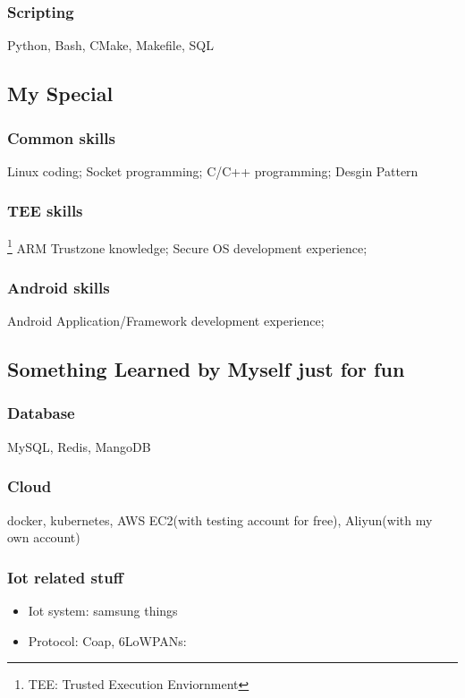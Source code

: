 \documentclass{article}
\begin{document}
\subsubsection{Scripting}
Python, Bash, CMake, Makefile, SQL

\subsection{My Special}

\subsubsection {Common skills}
Linux coding; Socket programming; C/C++ programming; Desgin Pattern

\subsubsection {TEE skills} \footnote{TEE: Trusted Execution Enviornment}
ARM Trustzone knowledge; Secure OS development experience;

\subsubsection {Android skills}
Android Application/Framework development experience;

\subsection {Something Learned by Myself just for fun}
\subsubsection {Database}
MySQL, Redis, MangoDB

\subsubsection {Cloud}
docker, kubernetes, AWS EC2(with testing account for free), Aliyun(with my own account)

\subsubsection{Iot related stuff}
\begin{itemize}
\item[1] Iot system: samsung things
\item[2] Protocol: Coap, 6LoWPANs:
\end{itemize}
\end{document}
